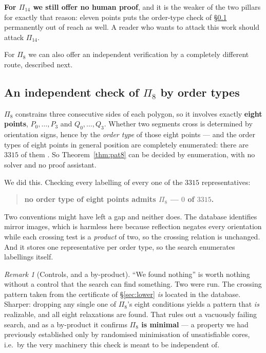 \documentclass[11pt,a4paper]{article}
\theoremstyle{plain}
\theoremstyle{definition}
\theoremstyle{remark}
\newtheorem{remark}[theorem]{Remark}
\begin{document}
\textbf{For $\Pi_{14}$ we still offer no human proof}, and it is the weaker of
the two pillars for exactly that reason: eleven points puts the order-type
check of \S\ref{sec:ot8} permanently out of reach as well. A reader who wants
to attack this work should attack $\Pi_{14}$.

For $\Pi_8$ we can also offer an independent verification by a completely
different route, described next.

\subsection{An independent check of \texorpdfstring{$\Pi_8$}{Pi 8} by order
types}\label{sec:ot8}

$\Pi_8$ constrains three consecutive sides of each polygon, so it involves
exactly \textbf{eight points}, $P_0,\dots,P_3$ and $Q_0,\dots,Q_3$. Whether two
segments cross is determined by orientation signs, hence by the \emph{order
type} of those eight points --- and the order types of eight points in general
position are completely enumerated: there are $3315$ of them
\cite{AichholzerAurenhammerKrasser2002,OrderTypeDatabase}. So
Theorem~\ref{thm:pat8} can be decided by enumeration, with no solver and no
proof assistant.

We did this. Checking every labelling of every one of the $3315$ representatives:
\begin{quote}
\textbf{no order type of eight points admits $\Pi_8$ --- $0$ of $3315$.}
\end{quote}
Two conventions might have left a gap and neither does. The database identifies
mirror images, which is harmless here because reflection negates every
orientation while each crossing test is a \emph{product} of two, so the crossing
relation is unchanged. And it stores one representative per order type, so the
search enumerates labellings itself.

\begin{remark}[Controls, and a by-product]\label{rem:ot8controls}
``We found nothing'' is worth nothing without a control that the search can find
something. Two were run. The crossing pattern taken from the certificate of
\S\ref{sec:lower} \emph{is} located in the database. Sharper: dropping any
single one of $\Pi_8$'s eight conditions yields a pattern that \emph{is}
realizable, and all eight relaxations are found. That rules out a vacuously
failing search, and as a by-product it confirms \textbf{$\Pi_8$ is minimal} ---
a property we had previously established only by randomised minimisation of
unsatisfiable cores, i.e.\ by the very machinery this check is meant to be
independent of.
\end{remark}
\end{document}
